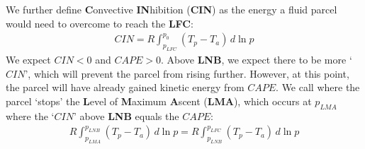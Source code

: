 We further define \textbf{C}onvective \textbf{IN}hibition (\textbf{CIN}) as the energy a fluid parcel would need to overcome to reach the \textbf{LFC}:
\begin{align*}
    \boxed{CIN = R\int_{p_{LFC}}^{p_{0}}\left( T_p-T_a \right)\,d\ln p}
\end{align*}
We expect $CIN<0$ and $CAPE>0$. Above \textbf{LNB}, we expect there to be more `$CIN$', which will prevent the parcel from rising further. However, at this point, the parcel will have already gained kinetic energy from $CAPE$. We call where the parcel `stops' the \textbf{L}evel of \textbf{M}aximum \textbf{A}scent (\textbf{LMA}), which occurs at $p_{LMA}$ where the `$CIN$' above \textbf{LNB} equals the $CAPE$:
\begin{align*}
    \boxed{
        R\int_{p_{LMA}}^{p_{LNB}}\left( T_p-T_a \right)\,d\ln p = 
        R\int_{p_{LNB}}^{p_{LFC}}\left( T_p-T_a \right)\,d\ln p
    }
\end{align*}

